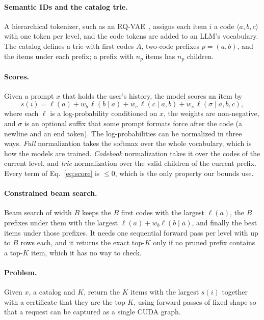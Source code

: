 \documentclass[sigconf,anonymous]{acmart}
\newcommand{\lp}{\ell}
\begin{document}
\paragraph{Semantic IDs and the catalog trie.} A hierarchical tokenizer, such as an RQ-VAE~\cite{rajput2023},
assigns each item $i$ a code $\langle a,b,c\rangle$ with one token per level, and the code tokens are added to an
LLM's vocabulary. The catalog defines a trie with first codes $A$, two-code prefixes $p=(a,b)$, and the items under
each prefix; a prefix with $n_p$ items has $n_p$ children.

\paragraph{Scores.} Given a prompt $x$ that holds the user's history, the model scores an item by
\begin{equation}
s(i) = \lp(a) + w_b\,\lp(b\mid a) + w_c\,\lp(c\mid a,b) + w_s\,\lp(\sigma\mid a,b,c),
\label{eq:score}
\end{equation}
where each $\lp$ is a log-probability conditioned on $x$, the weights are non-negative, and $\sigma$ is an optional
suffix that some prompt formats force after the code (a newline and an end token). The log-probabilities can be
normalized in three ways. \emph{Full} normalization takes the softmax over the whole vocabulary, which is how the
models are trained. \emph{Codebook} normalization takes it over the codes of the current level, and \emph{trie}
normalization over the valid children of the current prefix. Every term of Eq.~\ref{eq:score} is $\le0$, which is
the only property our bounds use.

\paragraph{Constrained beam search.} Beam search of width $B$ keeps the $B$ first codes with the largest $\lp(a)$,
the $B$ prefixes under them with the largest $\lp(a)+w_b\lp(b\mid a)$, and finally the best items under those
prefixes. It needs one sequential forward pass per level with up to $B$ rows each, and it returns the exact top-$K$
only if no pruned prefix contains a top-$K$ item, which it has no way to check.

\paragraph{Problem.} Given $x$, a catalog and $K$, return the $K$ items with the largest $s(i)$ together with a
certificate that they are the top $K$, using forward passes of fixed shape so that a request can be captured as a
single CUDA graph.
\end{document}
